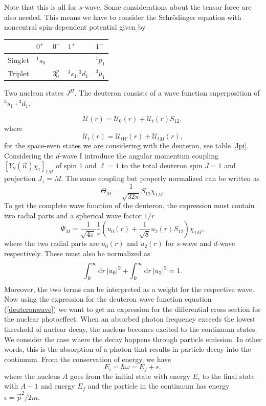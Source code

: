 Note that this is all for $s$-wave. Some considerations about the tensor force are also needed. This means we have to consider the Schrödinger equation with noncentral spin-dependent potential given by
\begin{margintable}
	\label{Jpi}
	\begin{tabular}{lllll}
		\toprule
		& $0^+$     & $0^-$   & $1^+$           & $1^-$   \\ \midrule
		Singlet & $^{1}s_0$ &         &                 & $^1p_1$ \\
		Triplet &           & $3^p_0$ & $^3s_1$,$^3d_1$ & $^3p_1$
	\end{tabular}
	\caption{Two nucleon states $J^\Pi$. The deuteron consists of a wave function superposition of $^3 s_1+^3d_1$.}
\end{margintable}
\begin{equation}
	\mathcal{U}(r) = \mathcal{U}_0(r) + \mathcal{U}_t(r) S_{12},
\end{equation}
where
\begin{equation}
	\mathcal{U}_t (r) = \mathcal{U}_{tW}(r)+\mathcal{U}_{tM}(r),
\end{equation}
for the space-even states we are considering with the deuteron, see table \ref{Jpi}. Considering the $d$-wave I introduce the angular momentum coupling $[Y_2(\vec{n})\chi_1]_{1M}$ of spin 1 and $\ell=1$ to the total deuteron spin $J=1$ and projection $J_z = M$. The same coupling but properly normalized can be written as
\begin{equation}
	\Theta_M = \frac{1}{\sqrt{32\pi}} S_{12}\chi_{1M}.
\end{equation}
To get the complete wave function of the deuteron, the expression must contain two radial parts and a spherical wave factor $1/r$
\begin{equation}\label{deuteronwave}
	\Psi_M = \frac{1}{\sqrt{4\pi}} \frac{1}{r} \left( u_0(r)+\frac{1}{\sqrt{8}}u_2(r)S_{12}\right)\chi_{1M},
\end{equation}
where the two radial parts are $u_0(r)$ and $u_2(r)$ for $s$-wave and $d$-wave respectively. These must also be normalized as
\begin{equation}
	\int_0^\infty \textrm{d}r \, \abs{u_0}^2 + \int_0^\infty \textrm{d}r \, \abs{u_2}^2 = 1.
\end{equation}
Moreover, the two terms can be interpreted as a weight for the respective wave. Now using the expression for the deuteron wave function equation (\ref{deuteronwave}) we want to get an expression for the differential cross section for the nuclear photoeffect. When an absorbed photon frequency exceeds the lowest threshold of nuclear decay, the nucleus becomes excited to the continuum states. We consider the case where the decay happens through particle emission. In other words, this is the absorption of a photon that results in particle decay into the continuum. From the conservation of energy, we have
\begin{equation}
	E_i = \hbar \omega = E_f + \epsilon,
\end{equation}
where the nucleus $A$ goes from the initial state with energy $E_i$ to the final state with $A-1$ and energy $E_f$ and the particle in the continuum has energy $\epsilon = \vec{p}^2/2m$. 

